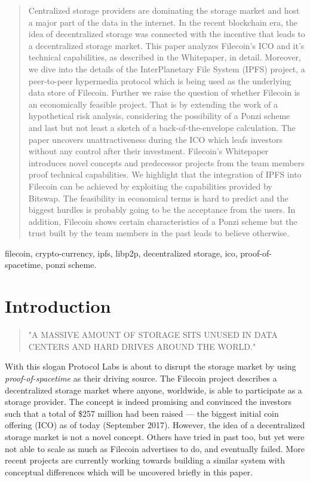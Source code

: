 \documentclass[conference]{IEEEtran}
\begin{document}
\begin{abstract}

Centralized storage providers are dominating the storage market and host a major part of the data in the internet.
In the recent blockchain era, the idea of decentralized storage was connected with the incentive that leads to a decentralized storage market.
This paper analyzes Filecoin's ICO and it's technical capabilities, as described in the Whitepaper, in detail.
Moreover, we dive into the details of the InterPlanetary File System (IPFS) project, a peer-to-peer hypermedia protocol which is being used as the underlying data store of Filecoin.
Further we raise the question of whether Filecoin is an economically feasible project.
That is by extending the work of a hypothetical risk analysis, considering the possibility of a Ponzi scheme and last but not least a sketch of a back-of-the-envelope calculation.
The paper uncovers unattractiveness during the ICO which leafs investors without any control after their investment.
Filecoin's Whitepaper introduces novel concepts and predecessor projects from the team members proof technical capabilities.
We highlight that the integration of IPFS into Filecoin can be achieved by exploiting the capabilities provided by Bitswap.
The feasibility in economical terms is hard to predict and the biggest hurdles is probably going to be the acceptance from the users.
In addition, Filecoin shows certain characteristics of a Ponzi scheme but the trust built by the team members in the past leads to believe otherwise.

\end{abstract}

\begin{IEEEkeywords}
filecoin, crypto-currency, ipfs, libp2p, decentralized storage, ico, proof-of-spacetime, ponzi scheme.
\end{IEEEkeywords}

\IEEEpeerreviewmaketitle

\section{Introduction}

\begin{quote}"A MASSIVE AMOUNT OF STORAGE SITS UNUSED IN DATA CENTERS AND HARD DRIVES AROUND THE WORLD." \cite{filecoin-io}\end{quote}
With this slogan Protocol Labs is about to disrupt the storage market by using \textit{proof-of-spacetime} as their driving source.
The Filecoin project describes a decentralized storage market where anyone, worldwide, is able to participate as a storage provider.
The concept is indeed promising and convinced the investors such that a total of \$257 million had been raised –-- the biggest initial coin offering (ICO) as of today (September 2017).
However, the idea of a decentralized storage market is not a novel concept.
Others\cite{tribler}\cite{mojo-nation} have tried in past too, but yet were not able to scale as much as Filecoin advertises to do, and eventually failed.
More recent projects\cite{storj}\cite{sia} are currently working towards building a similar system with conceptual differences which will be uncovered briefly in this paper.
\end{document}
